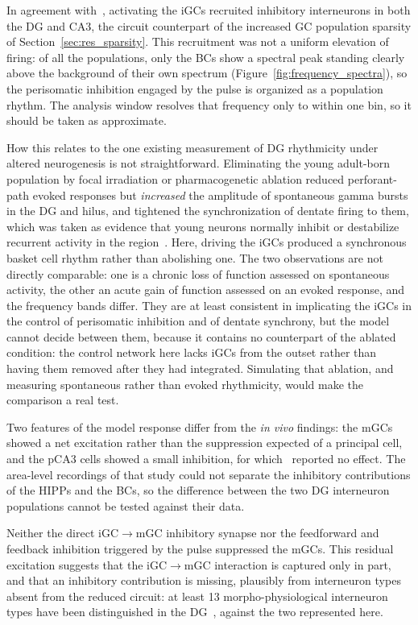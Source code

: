 In agreement with~\textcite{mchughAdultborn2022}, activating the iGCs recruited inhibitory interneurons in both the DG and CA3,
the circuit counterpart of the increased GC population sparsity of Section~\ref{sec:res_sparsity}. This recruitment was not a
uniform elevation of firing: of all the populations, only the BCs show a spectral peak standing clearly above the background of
their own spectrum (Figure~\ref{fig:frequency_spectra}), so the perisomatic inhibition engaged by the pulse is organized as a
population rhythm. The analysis window resolves that frequency only to within one bin, so it should be taken as approximate.

How this relates to the one existing measurement of DG rhythmicity under altered neurogenesis is not straightforward. Eliminating
the young adult-born population by focal irradiation or pharmacogenetic ablation reduced perforant-path evoked responses but
\textit{increased} the amplitude of spontaneous gamma bursts in the DG and hilus, and tightened the synchronization of dentate firing
to them, which was taken as evidence that young neurons normally inhibit or destabilize recurrent activity in the
region~\parencite{lacefieldEffects2012}. Here, driving the iGCs produced a synchronous basket cell rhythm rather than abolishing one.
The two observations are not directly comparable: one is a chronic loss of function assessed on spontaneous activity, the other an
acute gain of function assessed on an evoked response, and the frequency bands differ. They are at least consistent in implicating
the iGCs in the control of perisomatic inhibition and of dentate synchrony, but the model cannot decide between them, because it
contains no counterpart of the ablated condition: the control network here lacks iGCs from the outset rather than having them
removed after they had integrated. Simulating that ablation, and measuring spontaneous rather than evoked rhythmicity, would make
the comparison a real test.

Two features of the model response differ from the \textit{in vivo} findings: the mGCs showed a net excitation rather than the
suppression expected of a principal cell, and the pCA3 cells showed a small inhibition, for which~\textcite{mchughAdultborn2022}
reported no effect. The area-level recordings of that study could not separate the inhibitory contributions of the HIPPs and the
BCs, so the difference between the two DG interneuron populations cannot be tested against their data.

Neither the direct iGC$\to$mGC inhibitory synapse nor the feedforward and feedback inhibition triggered by the pulse suppressed
the mGCs. This residual excitation suggests that the iGC$\to$mGC interaction is captured only in part, and that an inhibitory
contribution is missing, plausibly from interneuron types absent from the reduced circuit: at least 13 morpho-physiological
interneuron types have been distinguished in the DG~\parencite{degroInterneuron2022}, against the two represented here.

